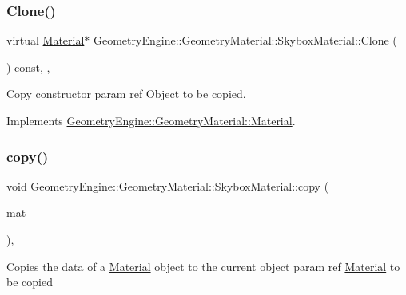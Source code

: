 \subsubsection{\texorpdfstring{Clone()}{Clone()}}
{\footnotesize\ttfamily virtual \mbox{\hyperlink{class_geometry_engine_1_1_geometry_material_1_1_material}{Material}}$\ast$ Geometry\+Engine\+::\+Geometry\+Material\+::\+Skybox\+Material\+::\+Clone (\begin{DoxyParamCaption}{ }\end{DoxyParamCaption}) const\hspace{0.3cm}{\ttfamily [inline]}, {\ttfamily [override]}, {\ttfamily [virtual]}}

Copy constructor param ref Object to be copied. 

Implements \mbox{\hyperlink{class_geometry_engine_1_1_geometry_material_1_1_material_ae5513ff06d536365e18ddc5e07e79784}{Geometry\+Engine\+::\+Geometry\+Material\+::\+Material}}.

\mbox{\label{class_geometry_engine_1_1_geometry_material_1_1_skybox_material_afcb8bf256fbb2927e2030fbe8a631af0}} 
\subsubsection{\texorpdfstring{copy()}{copy()}}
{\footnotesize\ttfamily void Geometry\+Engine\+::\+Geometry\+Material\+::\+Skybox\+Material\+::copy (\begin{DoxyParamCaption}\item[{const \mbox{\hyperlink{class_geometry_engine_1_1_geometry_material_1_1_skybox_material}{Skybox\+Material}} \&}]{mat }\end{DoxyParamCaption})\hspace{0.3cm}{\ttfamily [protected]}, {\ttfamily [virtual]}}

Copies the data of a \mbox{\hyperlink{class_geometry_engine_1_1_geometry_material_1_1_material}{Material}} object to the current object param ref \mbox{\hyperlink{class_geometry_engine_1_1_geometry_material_1_1_material}{Material}} to be copied \mbox{\label{class_geometry_engine_1_1_geometry_material_1_1_skybox_material_a0cc520b905996a178c80a2657bc9746f}} 
